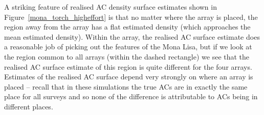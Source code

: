 \documentclass[10pt,a4paper]{article}
\begin{document}

A striking feature of realised AC density surface estimates shown in Figure~\ref{mona_torch_higheffort} is that no matter where the array is placed, the region away from the array has a flat estimated density (which approaches the mean estimated density). Within the array, the realised AC surface estimate does a reasonable job of picking out the features of the Mona Lisa, but if we look at the region common to all arrays (within the dashed rectangle) we see that the realised AC surface estimate of this region is quite different for the four arrays. Estimates of the realised AC surface depend very strongly on where an array is placed -- recall that in these simulations the true ACs are in exactly the same place for all surveys and so none of the difference is attributable to ACs being in different places.

\end{document}

